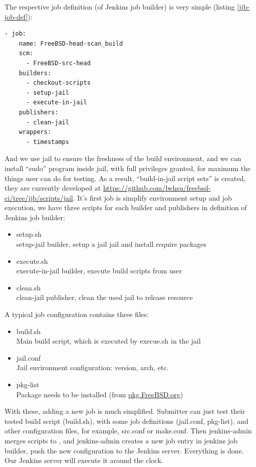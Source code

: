 \documentclass[a4paper,twocolumn,10pt]{article}
\begin{document}
The respective job definition (of Jenkins job builder) is very simple
(listing \ref{jjb-job-def}):

\begin{lstlisting}[caption=Job definition,label=jjb-job-def]
- job:
    name: FreeBSD-head-scan_build
    scm:
      - FreeBSD-src-head
    builders:
      - checkout-scripts
      - setup-jail
      - execute-in-jail
    publishers:
      - clean-jail
    wrappers:
      - timestamps
\end{lstlisting}

And we use jail to ensure the freshness of the build environment, and we can
install ``sudo'' \cite{sudo} program inside jail, with full privileges granted,
for maximum the things user can do for testing. As a result, ``build-in-jail
script sets'' is created, they are currently developed at
\url{https://github.com/lwhsu/freebsd-ci/tree/jjb/scripts/jail}. It's first job
is simplify environment setup and job execution, we have three scripts for each
builder and publishers in definition of Jenkins job builder:

\begin{itemize}
\item setup.sh\\
  setup-jail builder, setup a jail jail and install require packages
\item execute.sh\\
  execute-in-jail builder, execute build scripts from user
\item clean.sh\\
  clean-jail publisher, clean the used jail to release resource
\end{itemize}

A typical job configuration contains three files:

\begin{itemize}
\item build.sh\\
  Main build script, which is executed by execue.sh in the jail
\item jail.conf\\
  Jail environment configuration: version, arch, etc.
\item pkg-list\\
  Package needs to be installed (from \url{pkg.FreeBSD.org})
\end{itemize}

With these, adding a new job is much simplified. Submitter can just test their
tested build script (build.sh), with some job definitions (jail.conf,
pkg-list), and other configuration files, for example, src.conf or make.conf.
Then jenkins-admin merges scripts to , and
jenkins-admin creates a new job entry in jenkins job builder, push the new
configuration to the Jenkins server. Everything is done. Our Jenkins server
will execute it around the clock.
\end{document}
